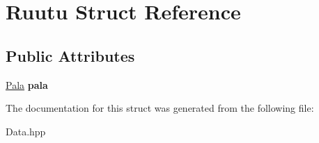 \hypertarget{struct_ruutu}{}\section{Ruutu Struct Reference}
\label{struct_ruutu}
\subsection*{Public Attributes}
\begin{DoxyCompactItemize}
\item 
\hypertarget{struct_ruutu_af3458980456ec261493739555e1930fc}{}\hyperlink{struct_pala}{Pala} {\bfseries pala}\label{struct_ruutu_af3458980456ec261493739555e1930fc}

\end{DoxyCompactItemize}


The documentation for this struct was generated from the following file\+:\begin{DoxyCompactItemize}
\item 
Data.\+hpp\end{DoxyCompactItemize}
